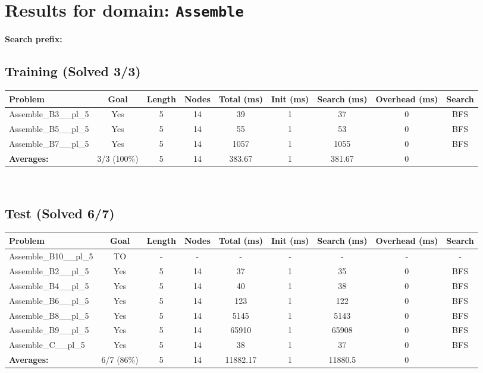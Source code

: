 \documentclass{article}
\begin{document}
\section*{Results for domain: \texttt{Assemble}}
\textbf{Search prefix:} 
\\[0.5cm]
\subsection*{Training (Solved 3/3)}
\begin{tabular}{lcccccccc}
\toprule
Problem & Goal & Length & Nodes & Total (ms) & Init (ms) & Search (ms) & Overhead (ms) & Search \\
\midrule
Assemble\_B3\_\_pl\_5 & Yes & 5 & 14 & 39 & 1 & 37 & 0 & BFS \\
Assemble\_B5\_\_pl\_5 & Yes & 5 & 14 & 55 & 1 & 53 & 0 & BFS \\
Assemble\_B7\_\_pl\_5 & Yes & 5 & 14 & 1057 & 1 & 1055 & 0 & BFS \\
\textbf{Averages:} & 3/3 (100\%) & 5 & 14 & 383.67 & 1 & 381.67 & 0 & \\
\bottomrule
\end{tabular}
\\[0.7cm]
\subsection*{Test (Solved 6/7)}
\begin{tabular}{lcccccccc}
\toprule
Problem & Goal & Length & Nodes & Total (ms) & Init (ms) & Search (ms) & Overhead (ms) & Search \\
\midrule
Assemble\_B10\_\_pl\_5 & TO & - & - & - & - & - & - & - \\
Assemble\_B2\_\_pl\_5 & Yes & 5 & 14 & 37 & 1 & 35 & 0 & BFS \\
Assemble\_B4\_\_pl\_5 & Yes & 5 & 14 & 40 & 1 & 38 & 0 & BFS \\
Assemble\_B6\_\_pl\_5 & Yes & 5 & 14 & 123 & 1 & 122 & 0 & BFS \\
Assemble\_B8\_\_pl\_5 & Yes & 5 & 14 & 5145 & 1 & 5143 & 0 & BFS \\
Assemble\_B9\_\_pl\_5 & Yes & 5 & 14 & 65910 & 1 & 65908 & 0 & BFS \\
Assemble\_C\_\_pl\_5 & Yes & 5 & 14 & 38 & 1 & 37 & 0 & BFS \\
\textbf{Averages:} & 6/7 (86\%) & 5 & 14 & 11882.17 & 1 & 11880.5 & 0 & \\
\bottomrule
\end{tabular}
\\[0.7cm]
\end{document}
